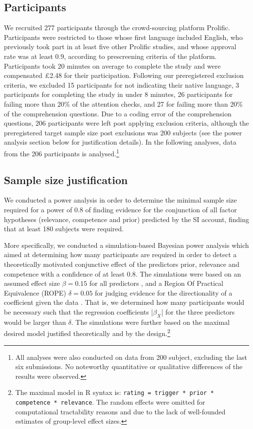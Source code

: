 \documentclass{sp}
\newcommand{\mf}[1]{\textcolor{BurntOrange}{[MF: #1]}}
\begin{document}
\subsection{Participants}
We recruited 277 participants through the crowd-sourcing platform Prolific. Participants were restricted to those whose first language included English, who previously took part in at least five other Prolific studies, and whose approval rate was at least 0.9, according to prescreening criteria of the platform. Participants took 20 minutes on average to complete the study and were compensated \pounds2.48 for their participation. Following our preregistered exclusion criteria, we excluded 15 participants for not indicating their native language, 3 participants for completing the study in under 8 minutes, 26 participants for failing more than 20\% of the attention checks, and 27 for failing more than 20\% of the comprehension questions. Due to a coding error of the comprehension questions, 206 participants were left post applying exclusion criteria, although the preregistered target sample size post exclusions was 200 subjects (see the power analysis section below for justification details).
In the following analyses, data from the 206 participants is analysed.\footnote{All analyses were also conducted on data from 200 subject, excluding the last six submissions. No noteworthy quantitative or qualitative differences of the results were observed.}

\subsection{Sample size justification}
We conducted a power analysis in order to determine the minimal sample size required for a power of 0.8 of finding evidence for the conjunction of all factor hypotheses (relevance, competence and prior) predicted by the SI account, finding that at least 180 subjects were required. 

More specifically, we conducted a simulation-based Bayesian power analysis which aimed at determining how many participants are required in order to detect a theoretically motivated conjunctive effect of the predictors prior, relevance and competence with a confidence of at least 0.8. The simulations were based on an assumed effect size $\beta = 0.15$ for all predictors \citep[e.g.,][]{degen2015investigating}, and a Region Of Practical Equivalence (ROPE) $\delta = 0.05$ for judging evidence for the directionality of a coefficient given the data \citep{kruschke2014doing}. That is, we determined how many participants would be necessary such that the regression coefficients |$\beta_X$| for the three predictors would be larger than $\delta$.
The simulations were further based on the maximal desired model justified theoretically and by the design.\footnote{The maximal model in R syntax is: \texttt{rating = trigger * prior * competence * relevance}. The random effects were omitted for computational tractability reasons and due to the lack of well-founded estimates of group-level effect sizes.}
\end{document}
